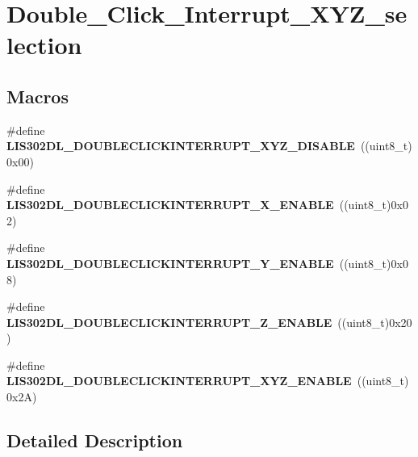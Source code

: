 \hypertarget{group___double___click___interrupt___x_y_z__selection}{\section{Double\-\_\-\-Click\-\_\-\-Interrupt\-\_\-\-X\-Y\-Z\-\_\-selection}
\label{group___double___click___interrupt___x_y_z__selection}
}
\subsection*{Macros}
\begin{DoxyCompactItemize}
\item 
\hypertarget{group___double___click___interrupt___x_y_z__selection_ga01d8f45577b5e3afada13d781078b1fb}{\#define {\bfseries L\-I\-S302\-D\-L\-\_\-\-D\-O\-U\-B\-L\-E\-C\-L\-I\-C\-K\-I\-N\-T\-E\-R\-R\-U\-P\-T\-\_\-\-X\-Y\-Z\-\_\-\-D\-I\-S\-A\-B\-L\-E}~((uint8\-\_\-t)0x00)}\label{group___double___click___interrupt___x_y_z__selection_ga01d8f45577b5e3afada13d781078b1fb}

\item 
\hypertarget{group___double___click___interrupt___x_y_z__selection_gaaaff7e07f75a220fe42890daca4b19e8}{\#define {\bfseries L\-I\-S302\-D\-L\-\_\-\-D\-O\-U\-B\-L\-E\-C\-L\-I\-C\-K\-I\-N\-T\-E\-R\-R\-U\-P\-T\-\_\-\-X\-\_\-\-E\-N\-A\-B\-L\-E}~((uint8\-\_\-t)0x02)}\label{group___double___click___interrupt___x_y_z__selection_gaaaff7e07f75a220fe42890daca4b19e8}

\item 
\hypertarget{group___double___click___interrupt___x_y_z__selection_ga965e1a21abb0d26adb7552df46f0e8ef}{\#define {\bfseries L\-I\-S302\-D\-L\-\_\-\-D\-O\-U\-B\-L\-E\-C\-L\-I\-C\-K\-I\-N\-T\-E\-R\-R\-U\-P\-T\-\_\-\-Y\-\_\-\-E\-N\-A\-B\-L\-E}~((uint8\-\_\-t)0x08)}\label{group___double___click___interrupt___x_y_z__selection_ga965e1a21abb0d26adb7552df46f0e8ef}

\item 
\hypertarget{group___double___click___interrupt___x_y_z__selection_ga0bf52ea652064516a0b4d8a3784319b3}{\#define {\bfseries L\-I\-S302\-D\-L\-\_\-\-D\-O\-U\-B\-L\-E\-C\-L\-I\-C\-K\-I\-N\-T\-E\-R\-R\-U\-P\-T\-\_\-\-Z\-\_\-\-E\-N\-A\-B\-L\-E}~((uint8\-\_\-t)0x20)}\label{group___double___click___interrupt___x_y_z__selection_ga0bf52ea652064516a0b4d8a3784319b3}

\item 
\hypertarget{group___double___click___interrupt___x_y_z__selection_ga18021ddb0e04665058656c562cf78dc3}{\#define {\bfseries L\-I\-S302\-D\-L\-\_\-\-D\-O\-U\-B\-L\-E\-C\-L\-I\-C\-K\-I\-N\-T\-E\-R\-R\-U\-P\-T\-\_\-\-X\-Y\-Z\-\_\-\-E\-N\-A\-B\-L\-E}~((uint8\-\_\-t)0x2\-A)}\label{group___double___click___interrupt___x_y_z__selection_ga18021ddb0e04665058656c562cf78dc3}

\end{DoxyCompactItemize}


\subsection{Detailed Description}
